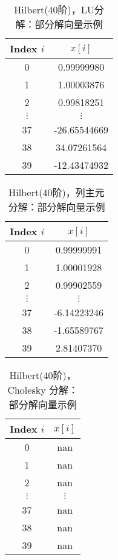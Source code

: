 \documentclass[UTF8]{ctexart}
\begin{document}
\begin{table}[ht]
  \centering
  \caption{Hilbert(40阶)，LU分解：部分解向量示例}
  \label{tab:hilbert40-LU}
  \begin{tabular}{cc}
  \toprule
  \textbf{Index} $i$ & $x[i]$ \\
  \midrule
  0   &  0.99999980  \\
  1   &  1.00003876  \\
  2   &  0.99818251  \\
  $\vdots$ & $\vdots$ \\
  37  & -26.65544669 \\
  38  &  34.07261564 \\
  39  &  -12.43474932 \\
  \bottomrule
  \end{tabular}
  \end{table}
  
  \begin{table}[ht]
  \centering
  \caption{Hilbert(40阶)，列主元分解：部分解向量示例}
  \label{tab:hilbert40-partialPivot}
  \begin{tabular}{cc}
  \toprule
  \textbf{Index} $i$ & $x[i]$ \\
  \midrule
  0   &  0.99999991  \\
  1   &  1.00001928  \\
  2   &  0.99902559  \\
  $\vdots$ & $\vdots$ \\
  37  & -6.14223246 \\
  38  &  -1.65589767 \\
  39  &  2.81407370 \\
  \bottomrule
  \end{tabular}
  \end{table}
  
  \begin{table}[ht]
  \centering
  \caption{Hilbert(40阶)，Cholesky 分解：部分解向量示例}
  \label{tab:hilbert40-cholesky}
  \begin{tabular}{cc}
  \toprule
  \textbf{Index} $i$ & $x[i]$ \\
  \midrule
  0   &  nan \\
  1   &  nan  \\
  2   &  nan  \\
  $\vdots$ & $\vdots$ \\
  37  & nan \\
  38  &  nan\\
  39  &  nan \\
  \bottomrule
  \end{tabular}
  \end{table}
  
\end{document}
